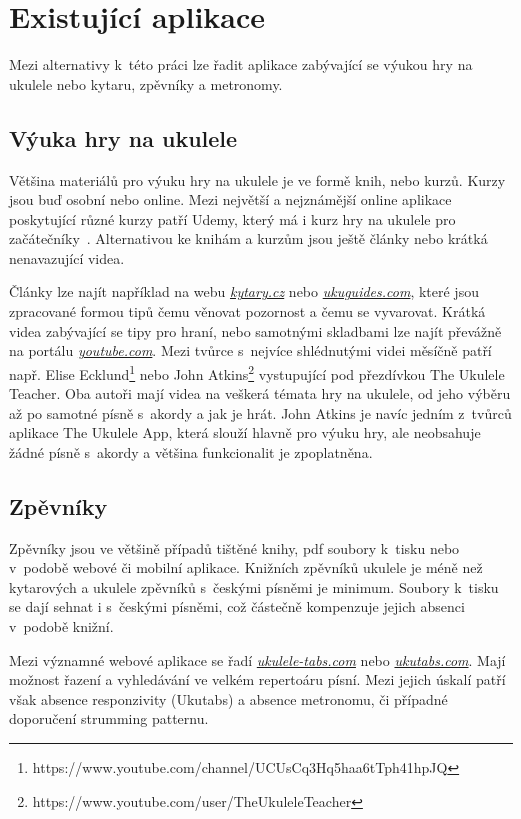 \section{Existující aplikace}
\label{sc:existing_apps}
Mezi alternativy k~této práci lze řadit aplikace zabývající se výukou hry na ukulele nebo kytaru, zpěvníky a metronomy.

\subsection{Výuka hry na ukulele}
\label{ss:existing_teaching_apps}
Většina materiálů pro výuku hry na ukulele je ve formě knih, nebo kurzů.
Kurzy jsou buď osobní nebo online. Mezi největší a nejznámější online aplikace poskytující různé kurzy patří Udemy, který má i kurz hry na ukulele pro začátečníky~\cite{puchmayr_complete}. Alternativou ke knihám a kurzům jsou ještě články nebo krátká nenavazující videa.

Články lze najít například na webu \href{www.kytary.cz}{\emph{kytary.cz}} nebo \href{www.ukuguides.com}{\emph{ukuguides.com}}, které jsou zpracované formou tipů čemu věnovat pozornost a čemu se vyvarovat. Krátká videa zabývající se tipy pro hraní, nebo samotnými skladbami lze najít převážně na portálu \href{www.youtube.com}{\emph{youtube.com}}. Mezi tvůrce s~nejvíce shlédnutými videi měsíčně patří např. Elise Ecklund\footnote{https://www.youtube.com/channel/UCUsCq3Hq5haa6tTph41hpJQ} nebo John Atkins\footnote{https://www.youtube.com/user/TheUkuleleTeacher} vystupující pod přezdívkou The Ukulele Teacher. Oba autoři mají videa na veškerá témata hry na ukulele, od jeho výběru až po samotné písně s~akordy a jak je hrát. John Atkins je navíc jedním z~tvůrců aplikace The Ukulele App, která slouží hlavně pro výuku hry, ale neobsahuje žádné písně s~akordy a většina funkcionalit je zpoplatněna.

\subsection{Zpěvníky}
\label{ss:songbooks}
Zpěvníky jsou ve většině případů tištěné knihy, pdf soubory k~tisku nebo v~podobě webové či mobilní aplikace. Knižních zpěvníků ukulele je méně než kytarových a ukulele zpěvníků s~českými písněmi je minimum. Soubory k~tisku se dají sehnat i s~českými písněmi, což částečně kompenzuje jejich absenci v~podobě knižní.

Mezi významné webové aplikace se řadí \href{www.ukulele-tabs.com}{\emph{ukulele-tabs.com}} nebo \href{www.ukutabs.com}{\emph{ukutabs.com}}. Mají možnost řazení a vyhledávání ve velkém repertoáru písní. Mezi jejich úskalí patří však absence responzivity (Ukutabs) a absence metronomu, či případné doporučení strumming patternu.

